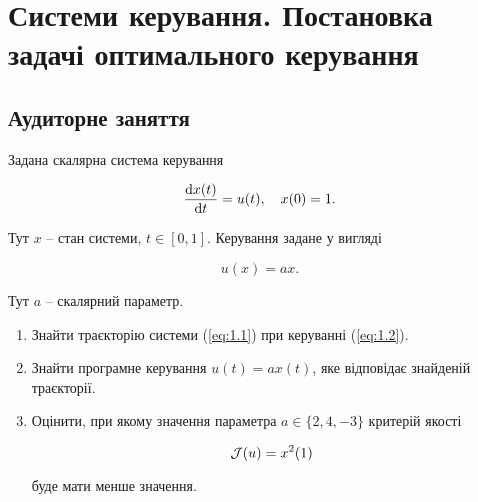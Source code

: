 \section{Системи керування. Постановка задачі оптимального керування}

\subsection{Аудиторне заняття}

\begin{problem}
	Задана скалярна система керування 
	
	\begin{equation}
		\label{eq:1.1}
		\frac{\mathop{}\!\mathrm{d} x(t)}{\mathop{}\!\mathrm{d} t} = u(t), \quad x(0) = 1.
	\end{equation}

	Тут $x$ -- стан системи, $t \in [0, 1]$. Керування задане у вигляді

	\begin{equation}
		\label{eq:1.2}
		u(x) = a x.
	\end{equation}

	Тут $a$ -- скалярний параметр.

	\begin{enumerate}
		\item Знайти траєкторію системи (\ref{eq:1.1}) при керуванні (\ref{eq:1.2}).

		\item Знайти програмне керування $u(t) = a x (t)$, яке відповідає знайденій траєкторії. 

		\item Оцінити, при якому значення параметра $a \in \{2, 4, -3\}$ критерій якості 

		\[ \mathcal{J}(u) = x^2 (1) \]

		буде мати менше значення.
	\end{enumerate}
\end{problem}

